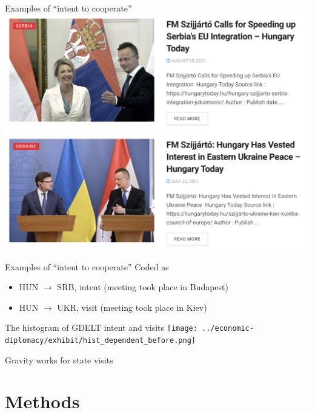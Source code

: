 \documentclass[
  ignorenonframetext,
  aspectratio=16,
]{beamer}
\providecommand{\tightlist}{%
  \setlength{\itemsep}{0pt}\setlength{\parskip}{0pt}}
\begin{document}
\begin{frame}{Examples of ``intent to cooperate''}
\protect\hypertarget{examples-of-intent-to-cooperate}{}
\includegraphics{exhibit/szijjarto.png}
\end{frame}

\begin{frame}{Examples of ``intent to cooperate''}
\protect\hypertarget{examples-of-intent-to-cooperate-1}{}
Coded as

\begin{itemize}
\tightlist
\item
  HUN \(\to\) SRB, intent (meeting took place in Budapest)
\item
  HUN \(\to\) UKR, visit (meeting took place in Kiev)
\end{itemize}
\end{frame}

\begin{frame}{The histogram of GDELT intent and visits}
\protect\hypertarget{the-histogram-of-gdelt-intent-and-visits}{}
\texttt{[image: ../economic-diplomacy/exhibit/hist\_dependent\_before.png]}
\end{frame}

\begin{frame}{Gravity works for state visits}
\protect\hypertarget{gravity-works-for-state-visits}{}

\end{frame}

\hypertarget{methods}{%
\section{Methods}\label{methods}}
\end{document}
